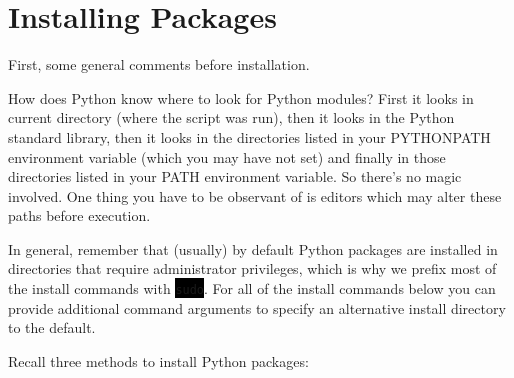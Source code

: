 \documentclass{article}
\newcommand{\inlinecode}[1]{%
\colorbox{black}{\lstinline[basicstyle=\ttfamily\color{white}]|#1|}}
\begin{document}
	\section*{Installing Packages}
	First, some general comments before installation. 

	How does Python know where to look for Python modules? First it
	looks in current directory (where the script was run), then it looks
	in the Python standard library, then it looks in the directories
	listed in your PYTHONPATH environment variable (which you may
	have not set) and finally in those directories listed in your
	PATH environment variable. So there's no magic involved. One
	thing you have to be observant of is editors which may alter
	these paths before execution. 

	In general, remember that (usually) by default Python packages
	are installed in directories that require administrator
	privileges, which is why we prefix most of the install commands
	with \inlinecode{sudo}. For all of the install commands below
	you can provide additional command arguments to specify an
	alternative install directory to the default.

	Recall three methods to install Python packages:
\end{document}
